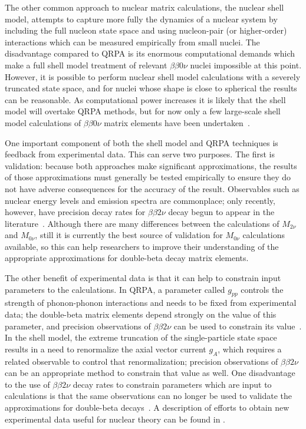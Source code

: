The other common approach to nuclear matrix calculations, the nuclear shell model, attempts to capture more fully the dynamics of a nuclear system by including the full nucleon state space and using nucleon-pair (or higher-order) interactions which can be measured empirically from small nuclei.  The disadvantage compared to QRPA is its enormous computational demands which make a full shell model treatment of relevant $\beta\beta 0\nu$ nuclei impossible at this point.  However, it is possible to perform nuclear shell model calculations with a severely truncated state space, and for nuclei whose shape is close to spherical the results can be reasonable.  As computational power increases it is likely that the shell model will overtake QRPA methods, but for now only a few large-scale shell model calculations of $\beta\beta 0\nu$ matrix elements have been undertaken~\cite{RMPbb0n}.

One important component of both the shell model and QRPA techniques is feedback from experimental data.  This can serve two purposes.  The first is validation: because both approaches make significant approximations, the results of those approximations must generally be tested empirically to ensure they do not have adverse consequences for the accuracy of the result.  Observables such as nuclear energy levels and emission spectra are commonplace; only recently, however, have precision decay rates for $\beta\beta 2\nu$ decay begun to appear in the literature~\cite{bb2nEXO2014}.  Although there are many differences between the calculations of $M_{2\nu}$ and $M_{0\nu}$, still it is currently the best source of validation for $M_{0\nu}$ calculations available, so this can help researchers to improve their understanding of the appropriate approximations for double-beta decay matrix elements.

The other benefit of experimental data is that it can help to constrain input parameters to the calculations.  In QRPA, a parameter called $g_{pp}$ controls the strength of phonon-phonon interactions and needs to be fixed from experimental data; the double-beta matrix elements depend strongly on the value of this parameter, and precision observations of $\beta\beta 2\nu$ can be used to constrain its value~\cite{RMPbb0n,PetrVogel0nuAnd2nuMatrixElements}.  In the shell model, the extreme truncation of the single-particle state space results in a need to renormalize the axial vector current $g_A$, which requires a related observable to control that renormalization; precision observations of $\beta\beta 2\nu$ can be an appropriate method to constrain that value as well.  One disadvantage to the use of $\beta\beta 2\nu$ decay rates to constrain parameters which are input to calculations is that the same observations can no longer be used to validate the approximations for double-beta decays~\cite{PetrVogel0nuAnd2nuMatrixElements}.  A description of efforts to obtain new experimental data useful for nuclear theory can be found in \cite{ZuberWorkshop}.

